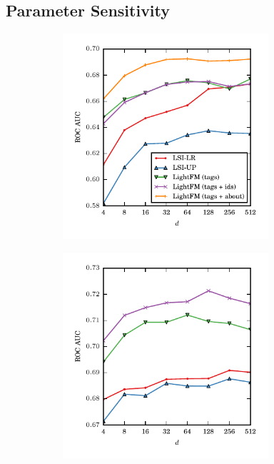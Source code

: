 \documentclass{sig-alternate}
\begin{document}
\subsection{Parameter Sensitivity}
\begin{figure}
\caption{Latent dimension sensitivity}
\newcommand\figDim{3in}
\begin{subfigure}[b]{0.5\textwidth}
\centering
\includegraphics[height=\figDim, width=\figDim]{dim_sensitivity_stackexchange.pdf}
\end{subfigure}
\begin{subfigure}[b]{0.5\textwidth}
\centering
\includegraphics[height=\figDim, width=\figDim]{dim_sensitivity_movielens.pdf}
\end{subfigure}
\label{fig:power}
\end{figure}
\end{document}
